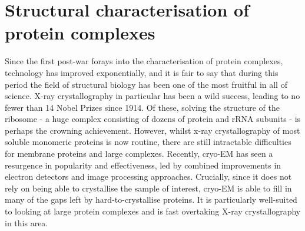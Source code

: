 \documentclass[a4paper,11pt,twoside,openright]{scrbook}
\begin{document}



\section{Structural characterisation of protein complexes}
Since the first post-war forays into the characterisation of protein complexes, technology has improved exponentially, and it is fair to say that during this period the field of structural biology has been one of the most fruitful in all of science. X-ray crystallography in particular has been a wild success, leading to no fewer than 14 Nobel Prizes since 1914. Of these, solving the structure of the ribosome - a huge complex consisting of dozens of protein and rRNA subunits - is perhaps the crowning achievement. However, whilst x-ray crystallography of most soluble monomeric proteins is now routine, there are still intractable difficulties for membrane proteins and large complexes. Recently, cryo-EM has seen a resurgence in popularity and effectiveness, led by combined improvements in electron detectors and image processing approaches. Crucially, since it does not rely on being able to crystallise the sample of interest, cryo-EM is able to fill in many of the gaps left by hard-to-crystallise proteins. It is particularly well-suited to looking at large protein complexes and is fast overtaking X-ray crystallography in this area.
\end{document}
